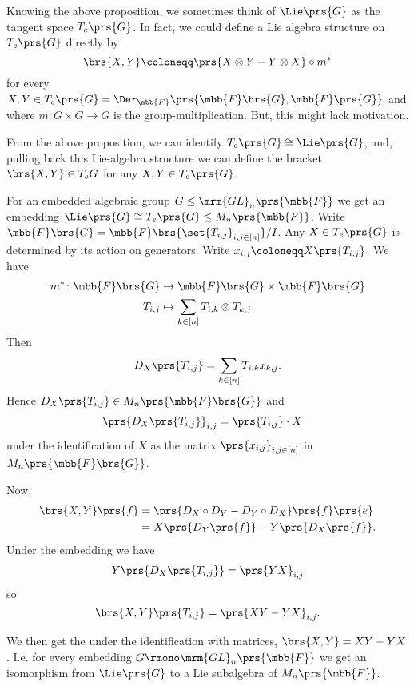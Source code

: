 \documentclass[10pt,a4paper,twoside,openany,hidelinks]{book}
\begin{document}
Knowing the above proposition, we sometimes think of $\Lie\prs{G}$ as the tangent space $T_e\prs{G}$.
In fact, we could define a Lie algebra structure on $T_e\prs{G}$ directly by
\begin{equation}\label{equation:direct_lie_bracket}
\brs{X,Y} \coloneqq \prs{X \otimes Y - Y \otimes X} \circ m^*
\end{equation}
for every $X,Y \in T_e\prs{G} = \Der_{\mbb{F}}\prs{\mbb{F}\brs{G}, \mbb{F}\prs{G}}$ and where $m \colon G \times G \to G$ is the group-multiplication. But, this might lack motivation.

From the above proposition, we can identify
$T_e\prs{G} \cong \Lie\prs{G}$, and, pulling back this Lie-algebra structure we can define the bracket
$\brs{X,Y} \in T_e G$ for any $X,Y \in T_e\prs{G}$.

For an embedded algebraic group $G \leq \mrm{GL}_n\prs{\mbb{F}}$ we get an embedding $\Lie\prs{G} \cong T_e\prs{G} \leq M_n\prs{\mbb{F}}$. Write $\mbb{F}\brs{G} = \mbb{F}\brs{\set{T_{i,j}}_{i,j \in [n]}}/I$. Any $X \in T_e\prs{G}$ is determined by its action on generators. Write $x_{i,j} \coloneqq X\prs{T_{i,j}}$. We have
\begin{align*}
m^* \colon \mbb{F}\brs{G} &\to \mbb{F}\brs{G} \times \mbb{F}\brs{G} \\
T_{i,j} &\mapsto \sum_{k \in [n]} T_{i,k} \otimes T_{k,j} \text{.}
\end{align*}
Then
\[D_X\prs{T_{i,j}} = \sum_{k \in [n]} T_{i,k} x_{k,j} \text{.}\]
Hence $D_X\prs{T_{i,j}} \in M_n\prs{\mbb{F}\brs{G}}$ and
\begin{align*}
\prs{D_X\prs{T_{i,j}}}_{i,j} &= \prs{T_{i,j}} \cdot X
\end{align*}
under the identification of $X$ as the matrix $\prs{x_{i,j}}_{i,j \in [n]}$ in $M_n\prs{\mbb{F}\brs{G}}$.

Now,
\begin{align*}
\brs{X,Y}\prs{f} &= \prs{D_X \circ D_Y - D_Y \circ D_X} \prs{f}\prs{e}
\\&= X\prs{D_Y\prs{f}} - Y\prs{D_X\prs{f}} \text{.}
\end{align*}
Under the embedding we have
\begin{align*}
Y\prs{D_X\prs{T_{i,j}}} = \prs{YX}_{i,j}
\end{align*}
so
\[\brs{X,Y}\prs{T_{i,j}} = \prs{XY - YX}_{i,j} \text{.}\]

We then get the under the identification with matrices, $\brs{X,Y} = XY - YX$. I.e. for every embedding $G \rmono \mrm{GL}_n\prs{\mbb{F}}$ we get an isomorphism from $\Lie\prs{G}$ to a Lie subalgebra of $M_n\prs{\mbb{F}}$.
\end{document}
